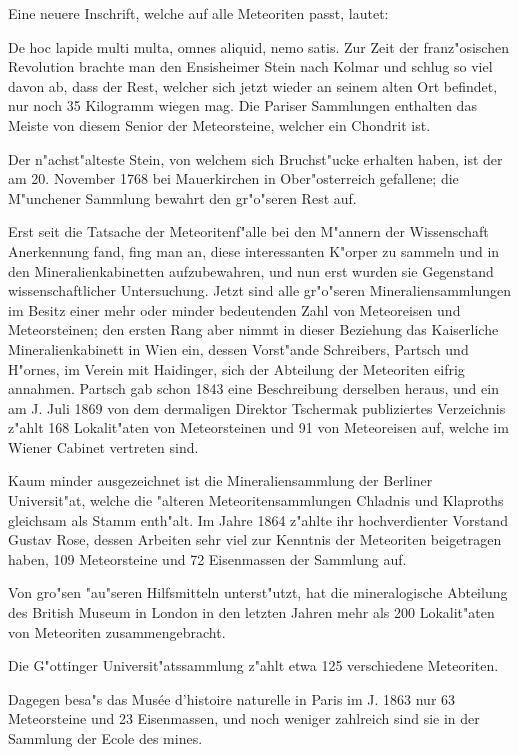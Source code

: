 \documentclass[a4paper, 11pt, oneside, german]{article}
\begin{document}
Eine neuere Inschrift, welche auf alle Meteoriten passt, lautet:

De hoc lapide multi multa, omnes aliquid, nemo satis. Zur Zeit der franz"osischen Revolution brachte man den Ensisheimer Stein nach Kolmar und schlug so viel davon ab, dass der Rest, welcher sich jetzt wieder an seinem alten Ort befindet, nur noch 35 Kilogramm wiegen mag. Die Pariser Sammlungen enthalten das Meiste von diesem Senior der Meteorsteine, welcher ein Chondrit ist.

Der n"achst"alteste Stein, von welchem sich Bruchst"ucke erhalten haben, ist der am 20. November 1768 bei Mauerkirchen in Ober"osterreich gefallene; die M"unchener Sammlung bewahrt den gr"o"seren Rest auf.

Erst seit die Tatsache der Meteoritenf"alle bei den M"annern der Wissenschaft Anerkennung fand, fing man an, diese interessanten K"orper zu sammeln und in den Mineralienkabinetten aufzubewahren, und nun erst wurden sie Gegenstand wissenschaftlicher Untersuchung. Jetzt sind alle gr"o"seren Mineraliensammlungen im Besitz einer mehr oder minder bedeutenden Zahl von Meteoreisen und Meteorsteinen; den ersten Rang aber nimmt in dieser Beziehung das Kaiserliche Mineralienkabinett in Wien ein, dessen Vorst"ande Schreibers, Partsch und H"ornes, im Verein mit Haidinger, sich der Abteilung der Meteoriten eifrig annahmen. Partsch gab schon 1843 eine Beschreibung derselben heraus, und ein am J. Juli 1869 von dem dermaligen Direktor Tschermak publiziertes Verzeichnis z"ahlt 168 Lokalit"aten von Meteorsteinen und 91 von Meteoreisen auf, welche im Wiener Cabinet vertreten sind.

Kaum minder ausgezeichnet ist die Mineraliensammlung der Berliner Universit"at, welche die "alteren Meteoritensammlungen Chladnis und Klaproths gleichsam als Stamm enth"alt. Im Jahre 1864 z"ahlte ihr hochverdienter Vorstand Gustav Rose, dessen Arbeiten sehr viel zur Kenntnis der Meteoriten beigetragen haben, 109 Meteorsteine und 72 Eisenmassen der Sammlung auf.

Von gro"sen "au"seren Hilfsmitteln unterst"utzt, hat die mineralogische Abteilung des British Museum in London in den letzten Jahren mehr als 200 Lokalit"aten von Meteoriten zusammengebracht.

Die G"ottinger Universit"atssammlung z"ahlt etwa 125 verschiedene Meteoriten.

Dagegen besa"s das Musée d'histoire naturelle in Paris im J. 1863 nur 63 Meteorsteine und 23 Eisenmassen, und noch weniger zahlreich sind sie in der Sammlung der Ecole des mines.
\end{document}
